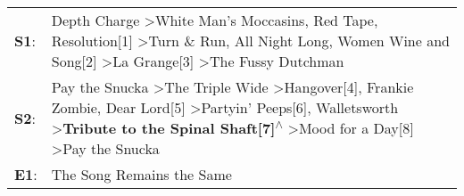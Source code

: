 \begin{supertabular}{p{0.03\textwidth}p{0.92\textwidth}}
 \textbf{S1}:  &                                                                                                 Depth Charge\textsuperscript{} \textgreater \enspace White Man's Moccasins\textsuperscript{}, \enspace Red Tape\textsuperscript{}, \enspace Resolution[1]\textsuperscript{} \textgreater \enspace Turn \& Run\textsuperscript{}, \enspace All Night Long\textsuperscript{}, \enspace Women Wine and Song[2]\textsuperscript{} \textgreater \enspace La Grange[3]\textsuperscript{} \textgreater \enspace The Fussy Dutchman\textsuperscript{}  \enspace  \\
 \textbf{S2}:  &  Pay the Snucka\textsuperscript{} \textgreater \enspace The Triple Wide\textsuperscript{} \textgreater \enspace Hangover[4]\textsuperscript{}, \enspace Frankie Zombie\textsuperscript{}, \enspace Dear Lord[5]\textsuperscript{} \textgreater \enspace Partyin' Peeps[6]\textsuperscript{}, \enspace Walletsworth\textsuperscript{} \textgreater \enspace \textbf{Tribute to the Spinal Shaft[7]\textsuperscript{$\wedge$}} \textgreater \enspace Mood for a Day[8]\textsuperscript{} \textgreater \enspace Pay the Snucka\textsuperscript{}  \enspace  \\
 \textbf{E1}:  &                                                                                                                                                                                                                                                                                                                                                                                                                                                                                                   The Song Remains the Same\textsuperscript{}  \enspace  \\
\end{supertabular}
